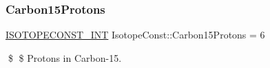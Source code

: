 \subsubsection{\texorpdfstring{Carbon15\+Protons}{Carbon15Protons}}
{\footnotesize\ttfamily \mbox{\hyperlink{group___isotope_const-_macros_ga5f18360b3e99483a35c32d789e62621c}{I\+S\+O\+T\+O\+P\+E\+C\+O\+N\+S\+T\+\_\+\+I\+NT}} Isotope\+Const\+::\+Carbon15\+Protons = 6}

\$ \$ Protons in Carbon-\/15. 